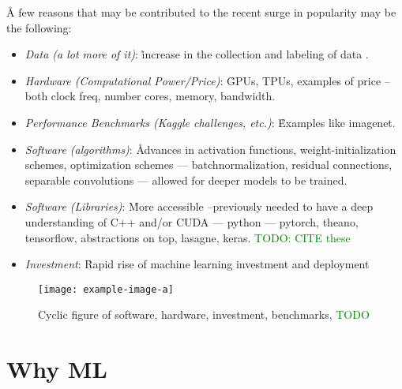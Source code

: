 
\r{A few reasons that may be contributed to the recent surge in popularity may be the following:}

\begin{itemize}
	
	\item \textit{Data (a lot more of it)}: \r{increase in the collection and labeling of data} .
	
	\item \textit{Hardware (Computational Power/Price)}: \r{GPUs, TPUs, examples of price -- both clock freq, number cores, memory, bandwidth}.
	
	\item \textit{Performance Benchmarks (Kaggle challenges, etc.)}: \r{Examples like imagenet}.
	
	\item \textit{Software (algorithms)}: \r{Advances in activation functions, weight-initialization schemes, optimization schemes --- batchnormalization, residual connections, separable convolutions --- allowed for deeper models to be trained.}
	
	\item \textit{Software (Libraries)}: \r{More accessible --previously needed to have a deep understanding of C++ and/or CUDA --- python --- pytorch, theano, tensorflow, abstractions on top, lasagne, keras}. \textcolor{green}{TODO: CITE these}
	
	\item \textit{Investment}: \r{Rapid rise of machine learning investment and deployment}
	
\end{itemize}

\begin{figure}[htp]
	\centering
	\texttt{[image: example-image-a]}\hfil
	\caption{Cyclic figure of software, hardware, investment, benchmarks, \textcolor{green}{TODO}}
	\label{fig:cyclic_rise_of_dl_overview}
\end{figure}

\section{Why ML}




